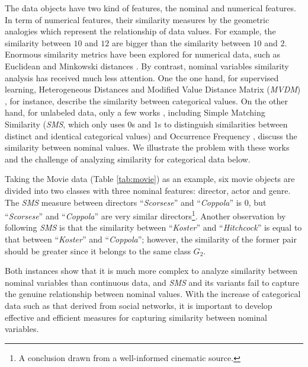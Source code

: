\documentclass{article}
\numberwithin{equation}{section}
\begin{document}
The data objects have two kind of features, the nominal and numerical features. In term of numerical features, their similarity measures by the geometric analogies which represent the relationship of data values. For example, the similarity between $10$ and $12$ are bigger than the similarity between $10$ and $2$. Enormous similarity metrics have been explored for numerical data, such as Euclidean and Minkowski distances \cite{Gan:2007}. By contrast, nominal variables similarity analysis has received much less attention. One the one hand, for supervised learning, Heterogeneous Distances \cite{Wilson:1997} and Modified Value Distance Matrix (\emph{MVDM}) \cite{Cost:1993}, for instance, describe the similarity between categorical values. On the other hand, for unlabeled data, only a few works \cite{Gan:2007}, including Simple Matching Similarity (\emph{SMS}, which only uses $0$s and $1$s to distinguish similarities between distinct and identical categorical values) and Occurrence Frequency \cite{Boriah:2008}, discuss the similarity between nominal values. We illustrate the problem with these works and the challenge of analyzing similarity for categorical data below.



Taking the Movie data (Table \ref{tab:movie}) as an example, six movie objects are divided into two classes with three nominal features: director, actor and genre. The \emph{SMS} measure between directors ``\emph{Scorsese}'' and ``\emph{Coppola}'' is $0$, but ``\emph{Scorsese}'' and ``\emph{Coppola}'' are very similar directors\footnote{A conclusion drawn  from a well-informed cinematic source.}. Another observation by following \emph{SMS} is that the similarity between ``\emph{Koster}'' and ``\emph{Hitchcock}'' is equal to that between ``\emph{Koster}'' and ``\emph{Coppola}''; however, the similarity of the former pair should be greater since it belongs to the same class $G_2$.

Both instances show that it is much more complex to analyze similarity between nominal variables than continuous data, and \emph{SMS} and its variants fail to capture the genuine relationship between nominal values.
With the increase of categorical data such as that derived from social networks, it is important to develop effective and efficient measures for capturing similarity between nominal variables.
\end{document}
